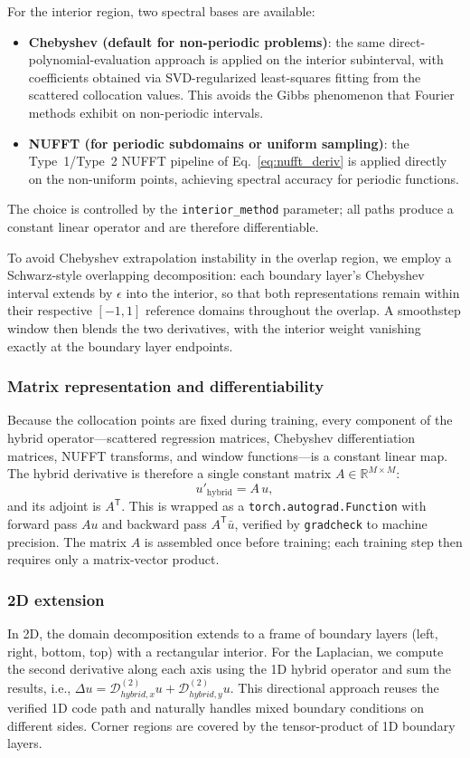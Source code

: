 \documentclass[sn-mathphys,Numbered]{sn-jnl}
\theoremstyle{thmstyleone}
\theoremstyle{thmstyletwo}
\theoremstyle{thmstylethree}
\newcommand{\R}{\mathbb{R}}
\newcommand{\T}{\mathsf{T}}
\newcommand{\calD}{\mathcal{D}}
\newcommand{\hybrid}{\mathrm{hybrid}}
\begin{document}
For the interior region, two spectral bases are available:
\begin{itemize}
    \item \textbf{Chebyshev (default for non-periodic problems)}: the same direct-polynomial-evaluation approach is applied on the interior subinterval, with coefficients obtained via SVD-regularized least-squares fitting from the scattered collocation values. This avoids the Gibbs phenomenon that Fourier methods exhibit on non-periodic intervals.
    \item \textbf{NUFFT (for periodic subdomains or uniform sampling)}: the Type~1/Type~2 NUFFT pipeline of Eq.~\eqref{eq:nufft_deriv} is applied directly on the non-uniform points, achieving spectral accuracy for periodic functions.
\end{itemize}
The choice is controlled by the \texttt{interior\_method} parameter; all paths produce a constant linear operator and are therefore differentiable.

To avoid Chebyshev extrapolation instability in the overlap region, we employ a Schwarz-style overlapping decomposition: each boundary layer's Chebyshev interval extends by $\epsilon$ into the interior, so that both representations remain within their respective $[-1,1]$ reference domains throughout the overlap. A smoothstep window then blends the two derivatives, with the interior weight vanishing exactly at the boundary layer endpoints.

\subsubsection{Matrix representation and differentiability}
Because the collocation points are fixed during training, every component of the hybrid operator---scattered regression matrices, Chebyshev differentiation matrices, NUFFT transforms, and window functions---is a constant linear map. The hybrid derivative is therefore a single constant matrix $A \in \R^{M \times M}$:
\begin{equation}
    u'_{\hybrid} = A \, u,
    \label{eq:hybrid_matrix}
\end{equation}
and its adjoint is $A^\T$. This is wrapped as a \texttt{torch.autograd.Function} with forward pass $A u$ and backward pass $A^\T \bar{u}$, verified by \texttt{gradcheck} to machine precision. The matrix $A$ is assembled once before training; each training step then requires only a matrix-vector product.

\subsubsection{2D extension}
In 2D, the domain decomposition extends to a frame of boundary layers (left, right, bottom, top) with a rectangular interior. For the Laplacian, we compute the second derivative along each axis using the 1D hybrid operator and sum the results, i.e., $\Delta u = \calD_{hybrid,x}^{(2)} u + \calD_{hybrid,y}^{(2)} u$. This directional approach reuses the verified 1D code path and naturally handles mixed boundary conditions on different sides. Corner regions are covered by the tensor-product of 1D boundary layers.
\end{document}
